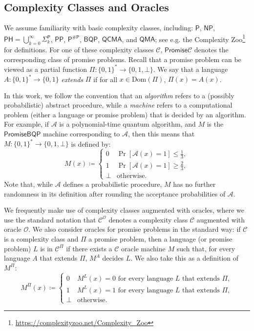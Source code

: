 \documentclass[11pt]{article}%
\newcommand{\Dom}{\mathrm{Dom}}
\begin{document}
\subsection{Complexity Classes and Oracles}
\label{sec:complexity_classes}
We assume familiarity with basic complexity classes, including: $\mathsf{P}$, $\mathsf{NP}$, $\mathsf{PH} = \bigcup_{k=0}^\infty \mathsf{\Sigma}_k^\mathsf{P}$, $\mathsf{PP}$, $\mathsf{P}^{\mathsf{\# P}}$, $\mathsf{BQP}$, $\mathsf{QCMA}$, and $\mathsf{QMA}$; see e.g. the Complexity Zoo\footnote{\url{https://complexityzoo.net/Complexity_Zoo}} for definitions. For one of these complexity classes $\mathcal{C}$, $\mathsf{Promise}\mathcal{C}$ denotes the corresponding class of promise problems. Recall that a promise problem can be viewed as a partial function $\Pi: \{0,1\}^* \to \{0,1,\bot\}$. We say that a language $A: \{0,1\}^* \to \{0,1\}$ \textit{extends} $\Pi$ if for all $x \in \Dom(\Pi)$, $\Pi(x) = A(x)$.

In this work, we follow the convention that an \textit{algorithm} refers to a (possibly probabilistic) abstract procedure, while a \textit{machine} refers to a computational problem (either a language or promise problem) that is decided by an algorithm. For example, if $\mathcal{A}$ is a polynomial-time quantum algorithm, and $M$ is the $\mathsf{PromiseBQP}$ machine corresponding to $\mathcal{A}$, then this means that $M: \{0,1\}^* \to \{0,1,\bot\}$ is defined by:
\[
M(x) \coloneqq \begin{cases}
0 & \Pr[\mathcal{A}(x) = 1] \le \frac{1}{3},\\
1 & \Pr[\mathcal{A}(x) = 1] \ge \frac{2}{3},\\
\bot & \text{otherwise}.
\end{cases}
\]
Note that, while $\mathcal{A}$ defines a probabilistic procedure, $M$ has no further randomness in its definition after rounding the acceptance probabilities of $\mathcal{A}$.

We frequently make use of complexity classes augmented with oracles, where we use the standard notation that $\mathcal{C}^\mathcal{O}$ denotes a complexity class $\mathcal{C}$ augmented with oracle $\mathcal{O}$. We also consider oracles for promise problems in the standard way: if $\mathcal{C}$ is a complexity class and $\Pi$ a promise problem, then a language (or promise problem) $L$ is in $\mathcal{C}^\Pi$ if there exists a $\mathcal{C}$ oracle machine $M$ such that, for every language $A$ that extends $\Pi$, $M^A$ decides $L$. We also take this as a definition of $M^\Pi$:
\[
M^\Pi(x) \coloneqq \begin{cases}
0 & M^L(x) = 0 \text{ for every language } L \text{ that extends } \Pi,\\
1 & M^L(x) = 1 \text{ for every language } L \text{ that extends } \Pi,\\
\bot & \text{otherwise}.
\end{cases}
\]
\end{document}
